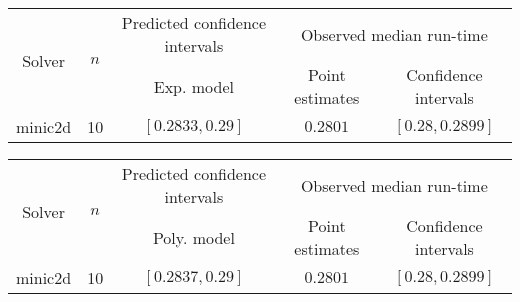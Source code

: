 \begin{tabular}{ccccc}
\hline 
\multirow{2}{*}{Solver} & \multirow{2}{*}{$n$} & Predicted confidence intervals & \multicolumn{2}{c}{Observed median  run-time}\tabularnewline
 &  & Exp. model  & Point estimates  & Confidence intervals\tabularnewline
\hline 
\hline 
\multirow{0}{*}{minic2d} & 10 & $\mathbf{\left[0.2833,0.29\right]}$ & $0.2801$ & $\left[0.28,0.2899\right]$ \tabularnewline 
\hline 
\end{tabular} 

\begin{tabular}{ccccc}
\hline 
\multirow{2}{*}{Solver} & \multirow{2}{*}{$n$} & Predicted confidence intervals & \multicolumn{2}{c}{Observed median  run-time}\tabularnewline
 &  & Poly. model  & Point estimates  & Confidence intervals\tabularnewline
\hline 
\hline 
\multirow{0}{*}{minic2d} & 10 & $\mathbf{\left[0.2837,0.29\right]}$ & $0.2801$ & $\left[0.28,0.2899\right]$ \tabularnewline 
\hline 
\end{tabular} 


